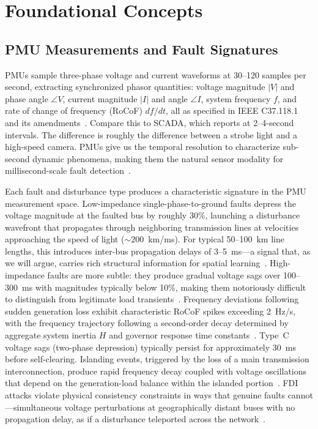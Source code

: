 \documentclass[journal]{IEEEtran}
\begin{document}
\section{Foundational Concepts}
\label{sec:foundations}

\subsection{PMU Measurements and Fault Signatures}

PMUs sample three-phase voltage and current waveforms at 30--120 samples per second, extracting synchronized phasor quantities: voltage magnitude $|V|$ and phase angle $\angle V$, current magnitude $|I|$ and angle $\angle I$, system frequency $f$, and rate of change of frequency (RoCoF) $df/dt$, all as specified in IEEE C37.118.1 and its amendments~\cite{ref4}. Compare this to SCADA, which reports at 2--4-second intervals. The difference is roughly the difference between a strobe light and a high-speed camera. PMUs give us the temporal resolution to characterize sub-second dynamic phenomena, making them the natural sensor modality for millisecond-scale fault detection~\cite{ref16}.

Each fault and disturbance type produces a characteristic signature in the PMU measurement space. Low-impedance single-phase-to-ground faults depress the voltage magnitude at the faulted bus by roughly 30\%, launching a disturbance wavefront that propagates through neighboring transmission lines at velocities approaching the speed of light (${\sim}200$~km/ms). For typical 50--100~km line lengths, this introduces inter-bus propagation delays of 3--5~ms---a signal that, as we will argue, carries rich structural information for spatial learning~\cite{ref17}. High-impedance faults are more subtle: they produce gradual voltage sags over 100--300~ms with magnitudes typically below 10\%, making them notoriously difficult to distinguish from legitimate load transients~\cite{ref18}. Frequency deviations following sudden generation loss exhibit characteristic RoCoF spikes exceeding 2~Hz/s, with the frequency trajectory following a second-order decay determined by aggregate system inertia $H$ and governor response time constants~\cite{ref19}. Type~C voltage sags (two-phase depression) typically persist for approximately 30~ms before self-clearing. Islanding events, triggered by the loss of a main transmission interconnection, produce rapid frequency decay coupled with voltage oscillations that depend on the generation-load balance within the islanded portion~\cite{ref20}. FDI attacks violate physical consistency constraints in ways that genuine faults cannot---simultaneous voltage perturbations at geographically distant buses with no propagation delay, as if a disturbance teleported across the network~\cite{ref13}.
\end{document}

